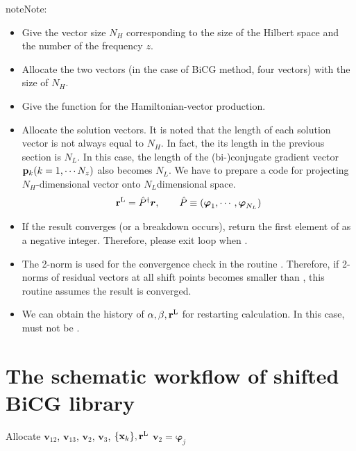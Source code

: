 \documentclass[letterpaper,10pt,dvipdfmx,openany]{sphinxmanual}
\begin{document}
\begin{notice}{note}{Note:}\begin{itemize}
\item {} 
Give the vector size \(N_H\) corresponding to the size of the
Hilbert space and the number of the frequency \(z\).

\item {} 
Allocate the two vectors (in the case of BiCG method, four vectors)
with the size of \(N_H\).

\item {} 
Give the function for the Hamiltonian-vector production.

\item {} 
Allocate the solution vectors. It is noted that the length of each
solution vector is not always equal to \(N_H\).
In fact, the its length in the previous section is \(N_L\).
In this case, the length of the (bi-)conjugate gradient vector
\({\bf p}_k (k=1,\cdots N_z)\) also
becomes \(N_L\).
We have to prepare a code for projecting
\(N_H\)-dimensional vector onto \(N_L\)dimensional space.
\begin{gather}
\begin{split}\begin{aligned}
{\bf r}^{\rm L} = {\hat P}^\dagger {\boldsymbol r}, \qquad
{\hat P} \equiv ({\boldsymbol \varphi}_1, \cdots, {\boldsymbol \varphi}_{N_L})
\end{aligned}\end{split}\notag
\end{gather}
\item {} 
If the result converges (or a breakdown occurs),
 return the first element of 
as a negative integer.
Therefore, please exit loop when  .

\item {} 
The 2-norm is used for the convergence check in the routine .
Therefore, if 2-norms of residual vectors at all shift points
becomes smaller than ,
this routine assumes the result is converged.

\item {} 
We can obtain the history of \(\alpha, \beta, {\bf r}^{\rm L}\)
for restarting calculation.
In this case,  must not be .

\end{itemize}
\end{notice}


\section{The schematic workflow of shifted BiCG library}
\label{komega_workflow_en:the-schematic-workflow-of-shifted-bicg-library}
Allocate \({\boldsymbol v}_{1 2}\), \({\boldsymbol v}_{1 3}\),
\({\boldsymbol v}_2\), \({\boldsymbol v}_3\),
\(\{{\bf x}_k\}, {\bf r}^{\rm L}\)
\({\boldsymbol v}_2 = {\boldsymbol \varphi_j}\)
\end{document}
